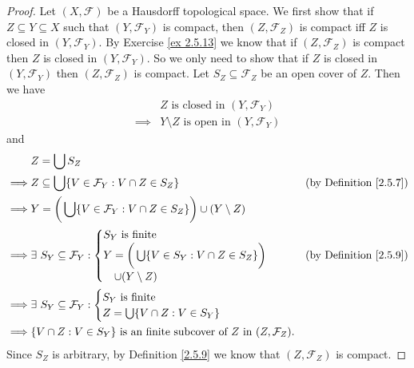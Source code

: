 \begin{proof}
    Let \((X, \mathcal{F})\) be a Hausdorff topological space.
    We first show that if \(Z \subseteq Y \subseteq X\) such that \((Y, \mathcal{F}_Y)\) is compact, then \((Z, \mathcal{F}_Z)\) is compact iff \(Z\) is closed in \((Y, \mathcal{F}_Y)\).
    By Exercise \ref{ex 2.5.13} we know that if \((Z, \mathcal{F}_Z)\) is compact then \(Z\) is closed in \((Y, \mathcal{F}_Y)\).
    So we only need to show that if \(Z\) is closed in \((Y, \mathcal{F}_Y)\) then \((Z, \mathcal{F}_Z)\) is compact.
    Let \(S_Z \subseteq \mathcal{F}_Z\) be an open cover of \(Z\).
    Then we have
    \begin{align*}
                 & Z \text{ is closed in } (Y, \mathcal{F}_Y)           \\
        \implies & Y \setminus Z \text{ is open in } (Y, \mathcal{F}_Y)
    \end{align*}
    and
    \begin{align*}
                 & Z = \bigcup S_Z                                                                                                                   \\
        \implies & Z \subseteq \bigcup \{V \in \mathcal{F}_Y : V \cap Z \in S_Z\}                               & \text{(by Definition \ref{2.5.7})} \\
        \implies & Y = \bigg(\bigcup \{V \in \mathcal{F}_Y : V \cap Z \in S_Z\}\bigg) \cup (Y \setminus Z)                                           \\
        \implies & \exists\ S_Y \subseteq \mathcal{F}_Y : \begin{cases}
                                                              S_Y \text{ is finite}                                    \\
                                                              Y = \bigg(\bigcup \{V \in S_Y : V \cap Z \in S_Z\}\bigg) \\
                                                              \quad \cup (Y \setminus Z)
                                                          \end{cases}                                  & \text{(by Definition \ref{2.5.9})}          \\
        \implies & \exists\ S_Y \subseteq \mathcal{F}_Y : \begin{cases}
                                                              S_Y \text{ is finite} \\
                                                              Z = \bigcup \{V \cap Z : V \in S_Y\}
                                                          \end{cases}                                                        \\
        \implies & \{V \cap Z : V \in S_Y\} \text{ is an finite subcover of } Z \text{ in } (Z, \mathcal{F}_Z).
    \end{align*}
    Since \(S_Z\) is arbitrary, by Definition \ref{2.5.9} we know that \((Z, \mathcal{F}_Z)\) is compact.


\end{proof}
